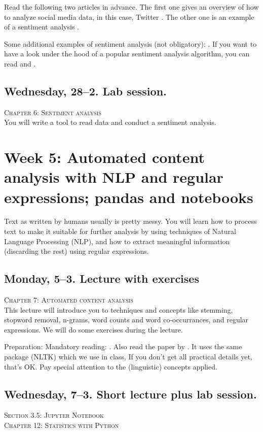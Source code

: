 \documentclass[a4paper,10pt]{report}
\begin{document}
Read the following two articles in advance. The first one gives an overview of how to analyze social media data, in this case, Twitter \citep{Bruns2013}. The other one is an example of a sentiment analysis \citep{Mostafa2013}.

Some additional examples of sentiment analysis (not obligatory): \cite{Huang2007,Pestian2012}. If you want to have a look under the hood of a popular sentiment analysis algorithm, you can read \cite{Thelwall2012} and \cite{Hutto2014}.


\subsection*{Wednesday, 28--2. Lab session.}
\textsc{ Chapter 6: Sentiment analysis}\\
You will write a tool to read data and conduct a sentiment analysis.






\section*{Week 5: Automated content analysis with NLP and regular expressions; pandas and notebooks}
Text as written by humans usually is pretty messy. You will learn how to process text to make it suitable for further analysis by using techniques of Natural Language Processing (NLP), and how to extract meaningful information (discarding the rest) using regular expressions.


\subsection*{Monday, 5--3. Lecture with exercises}
\textsc{ Chapter 7: Automated content analysis}\\
This lecture will introduce you to techniques and concepts like stemming, stopword removal, n-grams, word counts and word co-occurrances, and regular expressions. We will do some exercises during the lecture.

Preparation: Mandatory reading: \citealp{Boumans2016}. Also read the paper by \cite{Madnani}. It uses the same package (NLTK) which we use in class, If you don’t get all practical details yet, that’s OK. Pay special attention to the (linguistic) concepts applied.  

\subsection*{Wednesday, 7--3. Short lecture plus lab session.}
\textsc{ Section 3.5: Jupyter Notebook}\\
\textsc{ Chapter 12: Statistics with Python}\\
\end{document}
